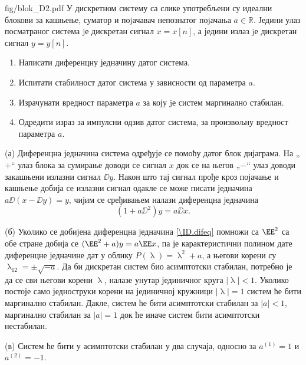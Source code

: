 \begin{slikaDesno}{fig/blok_D2.pdf}
    \PID У дискретном систему са слике употребљени су идеални блокови за кашњење,
    суматор и поjачавач непознатог поjачања $a \in \mathbb R$. 
    Једини улаз посматраног
    система jе дискретан сигнал $x = x[n]$, а једини излаз jе дискретан сигнал $y = y[n]$.
\end{slikaDesno}
\begin{enumerate}[label=(\alph*)]
    \item Написати диференцну једначину датог система.
    \item Испитати  стабилност датог система у зависности од параметра $a$.
    \item Израчунати вредност параметра $a$ за коју jе систем маргинално стабилан.
    \item Одредити израз за импулсни одзив датог система, за произвољну вредност параметра $a$.
\end{enumerate}

\RESENJE
(а) Диференцна једначина система одређује се помоћу датог блок дијаграма. На „$+$“ улаз блока за сумирање 
доводи се сигнал $x$ док се на његов „$-$“ улаз доводи закашњени излазни сигнал $\DD y$. Након што 
тај сигнал прође кроз појачање и кашњење добија се излазни сигнал одакле се може писати 
једначина $a \DD ( x - \DD y) = y$, чијим се сређивањем налази диференцна једначина 
\begin{equation}
    (1 + a \DD^2) y = a \DD x. \label{\ID.difeq}
\end{equation}

(б) Уколико се добијена диференцна једначина \eqref{\ID.difeq} помножи са $\EE^2$ са обе стране добија се 
$(\EE^2 + a)y = a \EE x$, па је карактеристични полином дате диференцне једначине дат у облику 
$P(\uplambda) = \uplambda^2 + a$, а његови корени су 
$\uplambda_{12} = \pm \sqrt{-a}$. Да би дискретан систем био асимптотски стабилан, потребно је да се сви његови 
корени $\uplambda$, налазе унутар јединичног круга $|\uplambda| < 1$. Уколико постоје само 
једноструки корени на јединичној 
кружници $|\uplambda| = 1$ систем ће бити маргинално стабилан. 
Дакле, систем ће бити асимптотски стабилан за $|a| < 1$, маргинално стабилан за $|a| = 1$ док ће иначе 
систем бити асимптотски нестабилан.

(в) Систем ће бити у асимптотски стабилан у два случаја, односно за $a^{(1)} = 1$ и $a^{(2)} = -1$.  

